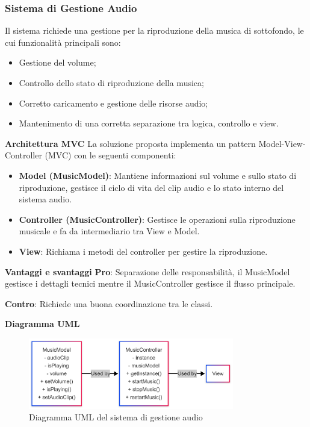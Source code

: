 \documentclass[a4paper,12pt]{report}
\begin{document}
\subsubsection{Sistema di Gestione Audio}
Il sistema richiede una gestione per la riproduzione della musica di sottofondo, le cui funzionalit\`a principali sono:
\begin{itemize}
    \item Gestione del volume;
    \item Controllo dello stato di riproduzione della musica;
    \item Corretto caricamento e gestione delle risorse audio;
    \item Mantenimento di una corretta separazione tra logica, controllo e view.
\end{itemize}

\textbf {Architettura MVC}\newline
La soluzione proposta implementa un pattern Model-View-Controller (MVC) con le seguenti componenti:
\begin{itemize}
    \item \textbf{Model (MusicModel)}: Mantiene informazioni sul volume e sullo stato di riproduzione, gestisce il ciclo di vita del clip audio e lo stato interno del sistema audio.
    \item \textbf{Controller (MusicController)}: Gestisce le operazioni sulla riproduzione musicale e fa da intermediario tra View e Model.
    \item \textbf{View}: Richiama i metodi del controller per gestire la riproduzione.
\end{itemize}

\textbf{Vantaggi e svantaggi}\newline
\textbf{Pro}: Separazione delle responsabilit\`a, il MusicModel gestisce i dettagli tecnici mentre il MusicController gestisce il flusso principale.

\textbf{Contro}: Richiede una buona coordinazione tra le classi.

\textbf{Diagramma UML}\newline
\begin{figure}[h]
    \centering 
    \includegraphics[width=0.8\textwidth]{img/uml_diagram.png}
    \caption{Diagramma UML del sistema di gestione audio}
    \label{fig:uml}
\end{figure}
\end{document}
